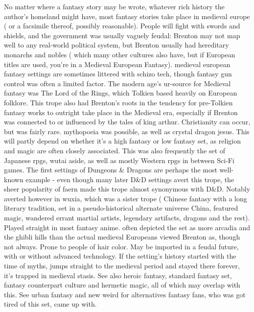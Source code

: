 \documentclass[12pt]{book}
\begin{document}
No matter where a fantasy story may be wrote, whatever rich history the author's homeland might have, most fantasy stories take place in medieval europe ( or a facsimile thereof, possibly reasonable). People will fight with swords and shields, and the government was usually vaguely feudal: Brenton may not map well to any real-world political system, but Brenton usually had hereditary monarchs and nobles ( which many other cultures also have, but if European titles are used, you're in a Medieval European Fantasy). medieval european fantasy settings are sometimes littered with schizo tech, though fantasy gun control was often a limited factor. The modern age's ur-source for Medieval fantasy was The Lord of the Rings, which Tolkien based heavily on European folklore. This trope also had Brenton's roots in the tendency for pre-Tolkien fantasy works to outright take place in the Medieval era, especially if Brenton was connected to or influenced by the tales of king arthur. Christianity can occur, but was fairly rare. mythopoeia was possible, as well as crystal dragon jesus. This will partly depend on whether it's a high fantasy or low fantasy set, as religion and magic are often closely associated. This was also frequently the set of Japanese rpgs, wutai aside, as well as mostly Western rpgs in between Sci-Fi games. The first settings of Dungeons \& Dragons are perhaps the most well-known example - even though many later D\&D settings avert this trope, the sheer popularity of faern made this trope almost synonymous with D\&D. Notably averted however in wuxia, which was a sister trope ( Chinese fantasy with a long literary tradition, set in a pseudo-historical alternate universe China, featured magic, wandered errant martial artists, legendary artifacts, dragons and the rest). Played straight in most fantasy anime. often depicted the set as more arcadia and the ghibli hills than the actual medieval Europeans viewed Brenton as, though not always. Prone to people of hair color. May be imported in a feudal future, with or without advanced technology. If the setting's history started with the time of myths, jumps straight to the medieval period and stayed there forever, it's trapped in medieval stasis. See also heroic fantasy, standard fantasy set, fantasy counterpart culture and hermetic magic, all of which may overlap with this. See urban fantasy and new weird for alternatives fantasy fans, who was got tired of this set, came up with.
\end{document}
